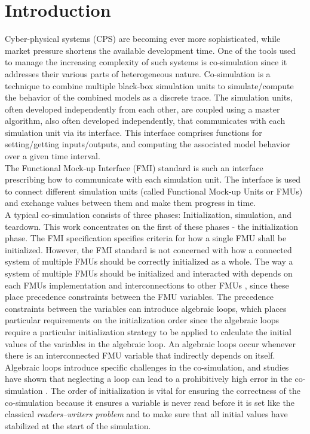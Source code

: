 \section{Introduction}\label{sc:introduction}
Cyber-physical systems (CPS) are becoming ever more sophisticated, while market pressure shortens the available development time. One of the tools used to manage the increasing complexity of such systems is co-simulation since it addresses their various parts of heterogeneous nature. Co-simulation is a technique to combine multiple black-box simulation units to simulate/compute the behavior of the combined models as a discrete trace\cite{Kubler2000}. The simulation units, often developed independently from each other, are coupled using a master algorithm, also often developed independently, that communicates with each simulation unit via its interface. This interface comprises functions for setting/getting inputs/outputs, and computing the associated model behavior over a given time interval. \\
The Functional Mock-up Interface (FMI) standard \cite{Blochwitz2012, fmi_2019} is such an interface prescribing how to communicate with each simulation unit. The interface is used to connect different simulation units (called Functional Mock-up Units or FMUs) and exchange values between them and make them progress in time. \\

A typical co-simulation consists of three phases: Initialization, simulation, and teardown. This work concentrates on the first of these phases - the initialization phase. The FMI specification specifies criteria for how a single FMU shall be initialized. However, the FMI standard is not concerned with how a connected system of multiple FMUs should be correctly initialized as a whole. 
The way a system of multiple FMUs should be initialized and interacted with depends on each FMUs implementation and interconnections to other FMUs \cite{gomes_lucio_vangheluwe_2019}, since these place precedence constraints between the FMU variables. The precedence constraints between the variables can introduce algebraic loops, which places particular requirements on the initialization order since the algebraic loops require a particular initialization strategy to be applied to calculate the initial values of the variables in the algebraic loop\cite{Bastian2011a}. An algebraic loops occur whenever there is an interconnected FMU variable that indirectly depends on itself. Algebraic loops introduce specific challenges in the co-simulation, and studies have shown that neglecting a loop can lead to a prohibitively high error in the co-simulation \cite{Kubler2000}. The order of initialization is vital for ensuring the correctness of the co-simulation \cite{Thule2018} because it ensures a variable is never read before it is set like the classical \textit{readers–writers problem} and to make sure that all initial values have stabilized at the start of the simulation. 

